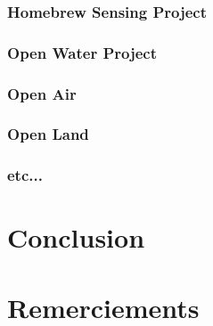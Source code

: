 \documentclass[10pt, conference, compsocconf]{llncs}
\begin{document}
		\subsubsection{Homebrew Sensing Project}
		\subsubsection{Open Water Project}
		\subsubsection{Open Air}
		\subsubsection{Open Land}
		\subsubsection{etc...}

\section{Conclusion}\label{sec:conclusion}

\section*{Remerciements}





\end{document}
